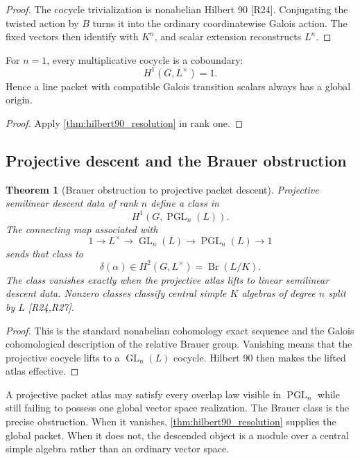 \documentclass{aomart}
\newtheorem{theorem}{Theorem}[section]
\theoremstyle{definition}
\theoremstyle{remark}
\newcommand{\GL}{\operatorname{GL}}
\newcommand{\PGL}{\operatorname{PGL}}
\newcommand{\Br}{\operatorname{Br}}
\newcommand{\Rcite}[1]{\textup{[#1]}}
\begin{document}
\begin{proof}
The cocycle trivialization is nonabelian Hilbert 90 \Rcite{R24}. Conjugating the twisted action by \(B\) turns it into the ordinary coordinatewise Galois action. The fixed vectors then identify with \(K^n\), and scalar extension reconstructs \(L^n\).
\end{proof}

\begin{corollary}\label{cor:line_hilbert90}
For \(n=1\), every multiplicative cocycle is a coboundary:
\[
 H^1(G,L^\times)=1.
\]
Hence a line packet with compatible Galois transition scalars always has a global origin.
\end{corollary}

\begin{proof}
Apply \cref{thm:hilbert90_resolution} in rank one.
\end{proof}

\subsection{Projective descent and the Brauer obstruction}

\begin{theorem}[Brauer obstruction to projective packet descent]\label{thm:brauer_obstruction}
Projective semilinear descent data of rank \(n\) define a class in
\[
 H^1(G,\PGL_n(L)).
\]
The connecting map associated with
\[
 1\longrightarrow L^\times
 \longrightarrow\GL_n(L)
 \longrightarrow\PGL_n(L)
 \longrightarrow1
\]
sends that class to
\[
 \boxed{
 \delta(\alpha)
 \in
 H^2(G,L^\times)
 =
 \Br(L/K).
 }
\]
The class vanishes exactly when the projective atlas lifts to linear semilinear descent data. Nonzero classes classify central simple \(K\) algebras of degree \(n\) split by \(L\) \Rcite{R24,R27}.
\end{theorem}

\begin{proof}
This is the standard nonabelian cohomology exact sequence and the Galois cohomological description of the relative Brauer group. Vanishing means that the projective cocycle lifts to a \(\GL_n(L)\) cocycle. Hilbert 90 then makes the lifted atlas effective.
\end{proof}

\begin{corollary}\label{cor:brauer_resolution_interpretation}
A projective packet atlas may satisfy every overlap law visible in \(\PGL_n\) while still failing to possess one global vector space realization. The Brauer class is the precise obstruction. When it vanishes, \cref{thm:hilbert90_resolution} supplies the global packet. When it does not, the descended object is a module over a central simple algebra rather than an ordinary vector space.
\end{corollary}
\end{document}
